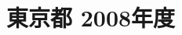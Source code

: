 \documentclass[../../hsm_tok_q.tex]{subfiles}
\begin{document}
    \section{東京都 2008年度}
    \subsection{　}
    
    \newpage
    \subsection{　}
    
    \newpage
    \subsection{　}
    
    \newpage
    \subsection{　}
    
    \newpage
    \subsection{　}
    
\end{document}
